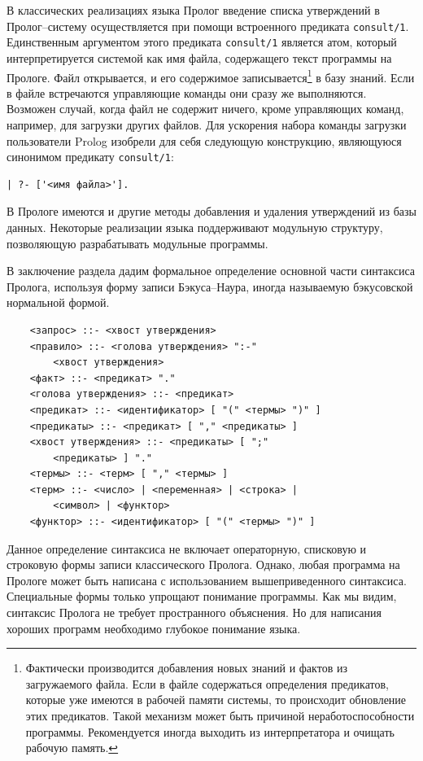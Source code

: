 \documentclass[12pt, openany, twoside]{book} %
\begin{document}
В классических реализациях языка Пролог введение списка утверждений в Пролог--систему осуществляется при помощи встроенного предиката {\tt consult/1}. Единственным аргументом этого предиката {\tt consult/1} является атом, который интерпретируется системой как имя файла, содержащего текст программы на Прологе. Файл открывается, и его содержимое записывается\footnote{Фактически производится добавления новых знаний и фактов из загружаемого файла. Если в файле содержаться определения предикатов, которые уже имеются в рабочей памяти системы, то происходит обновление этих предикатов. Такой механизм может быть причиной неработоспособности программы. Рекомендуется иногда выходить из интерпретатора и очищать рабочую память.} в базу знаний. Если в файле встречаются управляющие команды они сразу же выполняются. Возможен случай, когда файл не содержит ничего, кроме управляющих команд, например, для загрузки других файлов. Для ускорения набора команды загрузки пользователи Prolog изобрели для себя следующую конструкцию, являющуюся синонимом предикату {\tt consult/1}:
{\tt\begin{verbatim}
| ?- ['<имя файла>'].
\end{verbatim}}

В Прологе имеются и другие методы добавления и удаления утверждений из базы данных. Некоторые реализации языка поддерживают модульную структуру, позволяющую разрабатывать модульные программы.

В заключение раздела дадим формальное определение основной части синтаксиса Пролога, используя форму записи Бэкуса--Наура, иногда называемую бэкусовской нормальной формой.

{\tt\begin{verbatim}
    <запрос> ::- <хвост утверждения>
    <правило> ::- <голова утверждения> ":-"
        <хвост утверждения>
    <факт> ::- <предикат> "."
    <голова утверждения> ::- <предикат>
    <предикат> ::- <идентификатор> [ "(" <термы> ")" ]
    <предикаты> ::- <предикат> [ "," <предикаты> ]
    <хвост утверждения> ::- <предикаты> [ ";"
        <предикаты> ] "."
    <термы> ::- <терм> [ "," <термы> ]
    <терм> ::- <число> | <переменная> | <строка> |
        <символ> | <функтор>
    <функтор> ::- <идентификатор> [ "(" <термы> ")" ]
\end{verbatim}}

Данное определение синтаксиса не включает операторную, списковую и строковую формы записи классического Пролога. Однако, любая программа на Прологе может быть написана с использованием вышеприведенного синтаксиса. Специальные формы  только упрощают понимание программы. Как мы видим, синтаксис Пролога не требует пространного объяснения. Но для написания хороших программ необходимо глубокое понимание языка.
\end{document}
